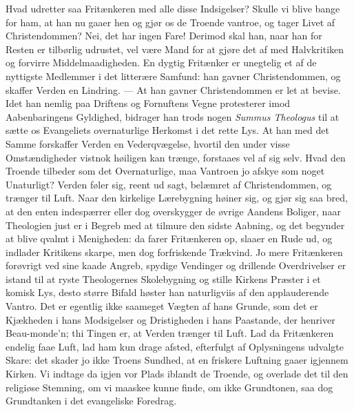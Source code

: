 \documentclass[12pt,a4paper]{book}
\begin{document}
Hvad udretter saa Fritænkeren med alle disse Indsigelser? Skulle vi blive bange for ham, at
han nu gaaer hen og gjør os de Troende vantroe, og tager Livet af Christendommen? Nei, det
har ingen Fare! Derimod skal han, naar han for Resten er tilbørlig udrustet, vel være Mand
for at gjøre det af med Halvkritiken og forvirre Middelmaadigheden. En dygtig Fritænker er
unegtelig et af de nyttigste Medlemmer i det litterære Samfund: han gavner Christendommen,
og skaffer Verden en Lindring. --- At han gavner Christendommen er let at bevise. Idet han
nemlig paa
Driftens og Fornuftens Vegne protesterer imod Aabenbaringens Gyldighed, bidrager han trods
nogen \textit{Summus Theologus} til at sætte os Evangeliets overnaturlige Herkomst i det
rette Lys. At han med det Samme forskaffer Verden en Vederqvægelse, hvortil den under visse
Omstændigheder vistnok høiligen kan trænge, forstaaes vel af sig selv. Hvad den Troende
tilbeder som det Overnaturlige, maa Vantroen jo afskye som noget Unaturligt? Verden føler
sig, reent ud sagt, belæmret af Christendommen, og trænger til Luft. Naar den kirkelige
Lærebygning høiner sig, og gjør sig saa bred, at den enten indespærrer eller dog
overskygger de øvrige Aandens Boliger, naar Theologien just er i Begreb med at tilmure den
sidste Aabning, og det begynder at blive qvalmt i Menigheden: da farer Fritænkeren op,
slaaer en Rude ud, og indlader Kritikens skarpe, men dog forfriskende Trækvind. Jo mere
Fritænkeren forøvrigt ved sine kaade Angreb, spydige Vendinger og drillende Overdrivelser
er istand til at ryste Theologernes Skolebygning og stille Kirkens Præster i et komisk Lys,
desto større Bifald høster han naturligviis af den applauderende Vantro. Det er egentlig
ikke saameget Vægten af hans Grunde, som det er Kjækheden i hans Modsigelser og
Dristigheden i hans Paastande, der henriver Beau-monde'n; thi Tingen er, at Verden trænger
til Luft. Lad da Fritænkeren endelig faae Luft, lad ham kun drage afsted, efterfulgt af
Oplysningens udvalgte Skare: det skader jo ikke Troens Sundhed, at en friskere Luftning
gaaer igjennem Kirken. Vi indtage da igjen vor Plads iblandt de Troende, og overlade det
til den religiøse Stemning, om vi maaskee kunne finde, om ikke Grundtonen, saa dog
Grundtanken i det evangeliske Foredrag.
\end{document}

